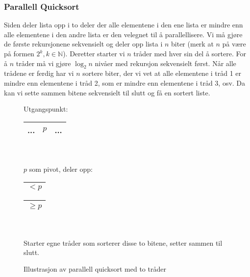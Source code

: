 \subsubsection{Parallell Quicksort}\label{parquick}
Siden  deler lista opp i to deler der alle elementene i den ene lista er mindre enn alle elementene i den andre lista er den velegnet til å parallellisere. Vi må gjøre de første rekursjonene sekvensielt og deler opp lista i $ n $ biter (merk at $ n $ på være på formen $ 2^k, k\in \mathbb{N} $). Deretter starter vi $ n $ tråder med hver sin del å sortere. For å $ n $ tråder må vi gjøre $ \log_2 n $ nivåer med rekursjon sekvensielt først. Når alle trådene er ferdig har vi $ n $ sortere biter, der vi vet at alle elementene i tråd 1 er mindre enn elementene i tråd 2, som er mindre enn elementene i tråd 3, osv. Da kan vi sette sammen bitene sekvensielt til slutt og få en sortert liste. 
\begin{figure}[H]
\caption{Illustrasjon av parallell quicksort med to tråder}
\centering
Utgangspunkt:\\
\begin{tabular}{| c |c| c |}
\hline
\quad\quad\quad\quad...\quad\quad\quad\quad&$ p $&\quad\quad\quad\quad...\quad\quad\quad\quad\\
\hline
\end{tabular}\\
~\\$ p $ som pivot, deler opp:\\
\begin{tabular}{| c |}
\hline
\quad\quad\quad\quad$ < p $\quad\quad\quad\quad\quad\\
\hline
\end{tabular}\quad\quad
\begin{tabular}{| c |}
\hline
\quad\quad\quad\quad$ \geq p $\quad\quad\quad\quad\quad\\
\hline
\end{tabular}\\
~\\ Starter egne tråder som sorterer disse to bitene, setter sammen til slutt.
\end{figure}


